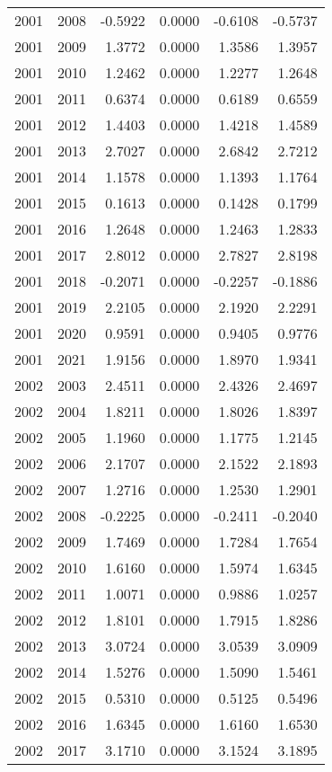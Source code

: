 \begin{tabular}{llrrrr}
2001 & 2008 & -0.5922 & 0.0000 & -0.6108 & -0.5737 \\
2001 & 2009 & 1.3772 & 0.0000 & 1.3586 & 1.3957 \\
2001 & 2010 & 1.2462 & 0.0000 & 1.2277 & 1.2648 \\
2001 & 2011 & 0.6374 & 0.0000 & 0.6189 & 0.6559 \\
2001 & 2012 & 1.4403 & 0.0000 & 1.4218 & 1.4589 \\
2001 & 2013 & 2.7027 & 0.0000 & 2.6842 & 2.7212 \\
2001 & 2014 & 1.1578 & 0.0000 & 1.1393 & 1.1764 \\
2001 & 2015 & 0.1613 & 0.0000 & 0.1428 & 0.1799 \\
2001 & 2016 & 1.2648 & 0.0000 & 1.2463 & 1.2833 \\
2001 & 2017 & 2.8012 & 0.0000 & 2.7827 & 2.8198 \\
2001 & 2018 & -0.2071 & 0.0000 & -0.2257 & -0.1886 \\
2001 & 2019 & 2.2105 & 0.0000 & 2.1920 & 2.2291 \\
2001 & 2020 & 0.9591 & 0.0000 & 0.9405 & 0.9776 \\
2001 & 2021 & 1.9156 & 0.0000 & 1.8970 & 1.9341 \\
2002 & 2003 & 2.4511 & 0.0000 & 2.4326 & 2.4697 \\
2002 & 2004 & 1.8211 & 0.0000 & 1.8026 & 1.8397 \\
2002 & 2005 & 1.1960 & 0.0000 & 1.1775 & 1.2145 \\
2002 & 2006 & 2.1707 & 0.0000 & 2.1522 & 2.1893 \\
2002 & 2007 & 1.2716 & 0.0000 & 1.2530 & 1.2901 \\
2002 & 2008 & -0.2225 & 0.0000 & -0.2411 & -0.2040 \\
2002 & 2009 & 1.7469 & 0.0000 & 1.7284 & 1.7654 \\
2002 & 2010 & 1.6160 & 0.0000 & 1.5974 & 1.6345 \\
2002 & 2011 & 1.0071 & 0.0000 & 0.9886 & 1.0257 \\
2002 & 2012 & 1.8101 & 0.0000 & 1.7915 & 1.8286 \\
2002 & 2013 & 3.0724 & 0.0000 & 3.0539 & 3.0909 \\
2002 & 2014 & 1.5276 & 0.0000 & 1.5090 & 1.5461 \\
2002 & 2015 & 0.5310 & 0.0000 & 0.5125 & 0.5496 \\
2002 & 2016 & 1.6345 & 0.0000 & 1.6160 & 1.6530 \\
2002 & 2017 & 3.1710 & 0.0000 & 3.1524 & 3.1895 \\

\end{tabular}
